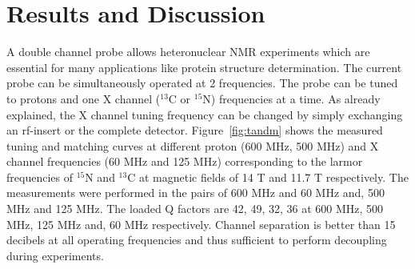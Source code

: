 \documentclass[preprint,12pt]{article}
\begin{document}
\section{Results and Discussion}
A double channel probe allows heteronuclear NMR experiments which are essential for many applications like protein structure determination. The current probe can be simultaneously operated at 2 frequencies. The probe can be tuned to protons and one X channel ($^{13}$C or $^{15}$N) frequencies at a time. As already explained, the X channel tuning frequency can be changed by simply exchanging an rf-insert or the complete detector. Figure~\ref{fig:tandm} shows the measured tuning and matching curves at different proton (600 MHz, 500 MHz) and X channel frequencies (60 MHz and 125 MHz) corresponding to the larmor frequencies of $^{15}$N and $^{13}$C at magnetic fields of 14 T and 11.7 T respectively. The measurements were performed in the pairs of 600 MHz and 60 MHz and, 500 MHz and 125 MHz. The loaded Q factors are 42, 49, 32, 36 at 600 MHz, 500 MHz, 125 MHz and, 60 MHz respectively. Channel separation is better than 15 decibels at all operating frequencies and thus sufficient to perform decoupling during experiments.\par
\end{document}
